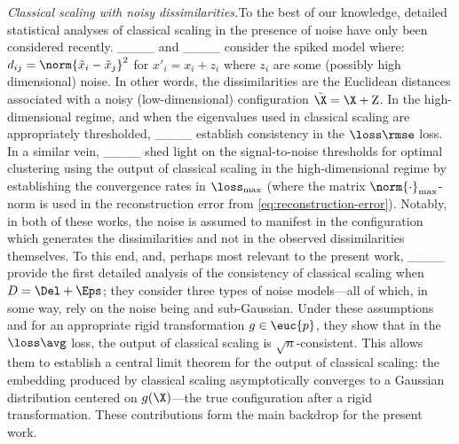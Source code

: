 \textit{Classical scaling with noisy dissimilarities.}\quad To the best of our knowledge, detailed statistical analyses of classical scaling in the presence of noise have only been considered recently. ____ and ____ consider the spiked model where: $d_{ij} = \norm{\tilde{x}_i - \tilde{x}_j}^2$ for ${x}'_i = x_i + z_i$ where $z_i$ are some (possibly high dimensional) noise. In other words, { the dissimilarities are the Euclidean distances associated with a noisy (low-dimensional) configuration} $\tilde{\X} = \X + \mathrm{Z}$. 
In the high-dimensional regime, and when the eigenvalues used in classical scaling are appropriately thresholded, ____ establish consistency in the $\loss\rmse$ loss. In a similar vein, ____ shed light on the signal-to-noise thresholds for optimal clustering using the output of classical scaling in the high-dimensional regime by establishing the convergence rates in $\loss_{\max}$ ({{where the matrix $\norm{\cdot}_{\max}$-norm is used in the reconstruction error from \cref{eq:reconstruction-error}}}). Notably, in both of these works, the noise is assumed to manifest in the configuration which generates the dissimilarities and not in the observed dissimilarities themselves. To this end, and, perhaps most relevant to the present work, ____ provide the first detailed analysis of the consistency of classical scaling when $D = \Del + \Eps$; they consider three types of noise models---all of which, in some way, rely on the noise being \iid{} and sub-Gaussian. Under these assumptions and for an appropriate rigid transformation $g \in \euc{p}$, they show that in the $\loss\avg$ loss, the output of classical scaling is $\sqrt{n}$-consistent. This allows them to establish a central limit theorem for the output of classical scaling: the embedding produced by classical scaling asymptotically converges to a Gaussian distribution centered on $g(\X)$---the true configuration after a rigid transformation. These contributions form the main backdrop for the present work.